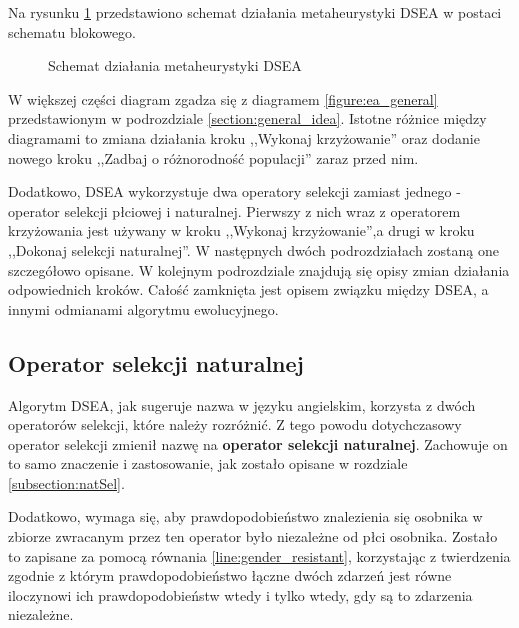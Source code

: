 \documentclass[./FM_mgr.tex]{subfiles}
\begin{document}
Na rysunku \ref{figure:dsea} przedstawiono schemat działania metaheurystyki DSEA w postaci schematu blokowego. 

\newpage

\begin{figure}[H]
	\caption{Schemat działania metaheurystyki DSEA \label{figure:dsea}}
\end{figure}

W większej części diagram zgadza się z diagramem \ref{figure:ea_general} przedstawionym w podrozdziale \ref{section:general_idea}. 
Istotne różnice między diagramami to zmiana działania kroku ,,Wykonaj krzyżowanie'' oraz dodanie nowego kroku ,,Zadbaj o różnorodność populacji'' zaraz przed nim. 

Dodatkowo, DSEA wykorzystuje dwa operatory selekcji zamiast jednego - operator selekcji płciowej i naturalnej.
Pierwszy z nich wraz z operatorem krzyżowania jest używany w kroku ,,Wykonaj krzyżowanie'',a drugi w kroku ,,Dokonaj selekcji naturalnej''.
W następnych dwóch podrozdziałach zostaną one szczegółowo opisane. 
W kolejnym podrozdziale znajdują się opisy zmian działania odpowiednich kroków.
Całość zamknięta jest opisem związku między DSEA, a innymi odmianami algorytmu ewolucyjnego.

\subsection{Operator selekcji naturalnej} \label{subsection:new_natSel}

Algorytm DSEA, jak sugeruje nazwa w języku angielskim, korzysta z dwóch operatorów selekcji, które należy rozróżnić. 
Z tego powodu dotychczasowy operator selekcji zmienił nazwę na \textbf{operator selekcji naturalnej}. 
Zachowuje on to samo znaczenie i zastosowanie, jak zostało opisane w rozdziale \ref{subsection:natSel}. 

Dodatkowo, wymaga się, aby prawdopodobieństwo znalezienia się osobnika w zbiorze zwracanym przez ten operator było niezależne od płci osobnika. 
Zostało to zapisane za pomocą równania \ref{line:gender_resistant}, korzystając z twierdzenia zgodnie z którym prawdopodobieństwo łączne dwóch zdarzeń jest równe iloczynowi ich prawdopodobieństw wtedy i tylko wtedy, gdy są to zdarzenia niezależne.
\end{document}
